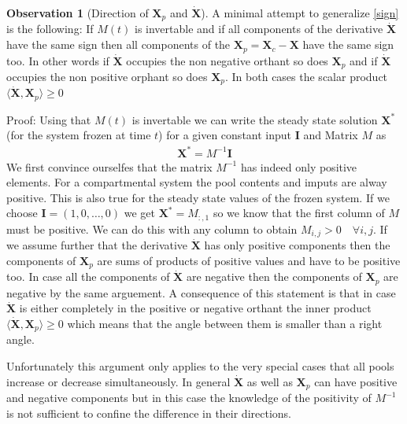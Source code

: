 \documentclass[journal abbreviation, manuscript]{copernicus}
\theoremstyle{definition}
\newtheorem{observation}{Observation}[section]
\newcommand{\X}{\mathbf{X}}
\newcommand{\I}{\mathbf{I}}
\begin{document}
\begin{observation}[Direction of $\X_p$ and $\dot{\X}$]
A minimal attempt to generalize \eqref{sign} is the following:
If $M(t)$ is invertable 
and if all components of the derivative $\dot{\X}$ have the same sign then all components of the $\X_p=\X_c-\X$ have the same sign too.
In other words if $\dot{\X}$ occupies the non negative orthant so does $\X_p$ and if $\dot{\X}$ occupies the non positive orphant so does $\X_p$. In both cases the scalar product $\langle \dot{\X},\X_p \rangle \ge 0$

Proof:
Using that $M(t)$ is invertable we can write the steady state solution $\X^*$ (for the system frozen at time $t$) for a given constant input $\I$ and Matrix $M$ as
\begin{align}
\X^*=M^{-1}\I
\end{align}
We first convince ourselfes that the matrix $M^{-1}$ has indeed only positive elements.
For a compartmental system the pool contents and imputs are alway positive.
This is also true for the steady state values of the frozen system.
If we choose $\I = (1,0,\dots, 0) $ we get $\X^*=M_{:,1}$ so we know that 
the first column of $M$ must be positive. 
We can do this with any column to obtain $M_{i,j}>0 \quad \forall i,j$.
If we assume further that the derivative $\dot{\X}$ has only positive components then the components of 
$\X_p$ are sums of products of positive values and have to be positive too.
In case all the components of $\dot{\X}$ are negative then the components of $\X_p$ are negative by the same arguement.
A consequence of this statement is that in case $\dot{\X}$ is either completely in the positive or negative orthant the inner product $\langle \dot{\X},\X_p \rangle \ge 0$ which means that the angle between them is smaller than a right angle.

Unfortunately this argument only applies to the very special cases that all pools increase or decrease simultaneously.
In general $\dot{\X}$ as well as $\X_p$ can have positive and negative components but in this case the knowledge of the positivity
of $M^{-1}$ is not sufficient to confine the difference in their directions.
\end{observation}
\end{document}
